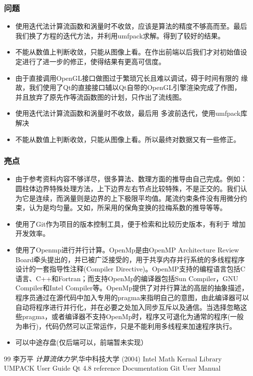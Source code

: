 \documentclass[12pt]{article}
\begin{document}
\subsubsection{问题}
\begin{itemize}
\item 使用迭代法计算流函数和涡量时不收敛，应该是算法的精度不够高而至。最后我们换了方程的迭代方法，并利用umfpack求解。得到了较好的结果。
\item 不能从数值上判断收敛，只能从图像上看。在作出前端以后我们才对初始值设定进行了进一步的修正，使得结果有更高可信度。
\item 由于直接调用OpenGL接口做图过于繁琐冗长且难以调试，碍于时间有限的
  缘故，我们使用了Qt的直接接口辅以Qt自带的OpenGL引擎渲染完成了作图，
  并且放弃了原先作等流函数图的计划，只作出了流线图。

\item 使用迭代法计算流函数和涡量时不收敛，最后用 多波前迭代，使用umfpack库解决

\item 不能从数值上判断收敛，只能从图像上看。所以最终对数据又有一些修正。


\end{itemize}
\subsubsection{亮点}
\begin{itemize}
\item 由于参考资料内容不够详尽，很多算法、数理方面的推导由自己完成。例如：圆柱体边界特殊处理方法，上下边界左右节点比较特殊，不是正交的。我们认为它是连续，而涡量则是边界的上下极限平均值。尾流约束条件没有用微分约束，认为是均匀量。又如，所采用的保角变换的拉梅系数的推导等等。
\item 使用了Git作为项目的版本控制工具，便于检索和比较历史版本，有利于
  增加开发效率。
\item 使用了Openmp进行并行计算。OpenMp是由OpenMP Architecture Review Board牵头提出的，并已被广泛接受的，用于共享内存并行系统的多线程程序设计的一套指导性注释(Compiler Directive)。OpenMP支持的编程语言包括C语言、C++和Fortran；而支持OpenMp的编译器包括Sun Compiler，GNU Compiler和Intel Compiler等。OpenMp提供了对并行算法的高层的抽象描述，程序员通过在源代码中加入专用的pragma来指明自己的意图，由此编译器可以自动将程序进行并行化，并在必要之处加入同步互斥以及通信。当选择忽略这些pragma，或者编译器不支持OpenMp时，程序又可退化为通常的程序(一般为串行)，代码仍然可以正常运作，只是不能利用多线程来加速程序执行。
\item 可以中途存盘(仅后端可以，前端暂未实现）

\end{itemize}


\begin{thebibliography}
{99}
  李万平
 \emph{计算流体力学},华中科技大学 
(2004)
Intel Math Kernal Library
UMPACK User Guide
Qt 4.8 reference Documentation
Git User Manual


  \end{thebibliography}
\end{document}
